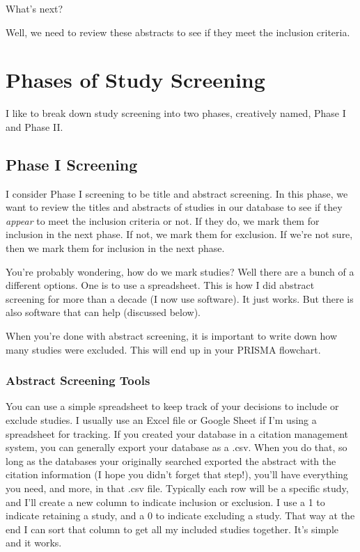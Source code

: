 \documentclass[
]{book}
\begin{document}
What's next?

Well, we need to review these abstracts to see if they meet the inclusion criteria.

\hypertarget{phases-of-study-screening}{%
\section{Phases of Study Screening}\label{phases-of-study-screening}}

I like to break down study screening into two phases, creatively named, Phase I and Phase II.

\hypertarget{phase-i-screening}{%
\subsection{Phase I Screening}\label{phase-i-screening}}

I consider Phase I screening to be title and abstract screening. In this phase, we want to review the titles and abstracts of studies in our database to see if they \emph{appear} to meet the inclusion criteria or not. If they do, we mark them for inclusion in the next phase. If not, we mark them for exclusion. If we're not sure, then we mark them for inclusion in the next phase.

You're probably wondering, how do we mark studies? Well there are a bunch of a different options. One is to use a spreadsheet. This is how I did abstract screening for more than a decade (I now use software). It just works. But there is also software that can help (discussed below).

When you're done with abstract screening, it is important to write down how many studies were excluded. This will end up in your PRISMA flowchart.

\hypertarget{abstract-screening-tools}{%
\subsubsection{Abstract Screening Tools}\label{abstract-screening-tools}}

You can use a simple spreadsheet to keep track of your decisions to include or exclude studies. I usually use an Excel file or Google Sheet if I'm using a spreadsheet for tracking. If you created your database in a citation management system, you can generally export your database as a .csv. When you do that, so long as the databases your originally searched exported the abstract with the citation information (I hope you didn't forget that step!), you'll have everything you need, and more, in that .csv file. Typically each row will be a specific study, and I'll create a new column to indicate inclusion or exclusion. I use a 1 to indicate retaining a study, and a 0 to indicate excluding a study. That way at the end I can sort that column to get all my included studies together. It's simple and it works.
\end{document}
